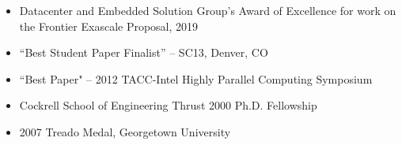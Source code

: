 \vspace{-0.3in}

\begin{itemize}
	\itemsep 0pt
	\item Datacenter and Embedded Solution Group’s Award of Excellence for work on the Frontier Exascale Proposal, 2019
        \item ``Best Student Paper Finalist'' -- SC13, Denver, CO
	\item ``Best Paper" -- 2012 TACC-Intel Highly Parallel Computing
	      Symposium 
        \item Cockrell School of Engineering Thrust 2000 Ph.D. Fellowship
        \item 2007 Treado Medal, Georgetown University      
\end{itemize}

